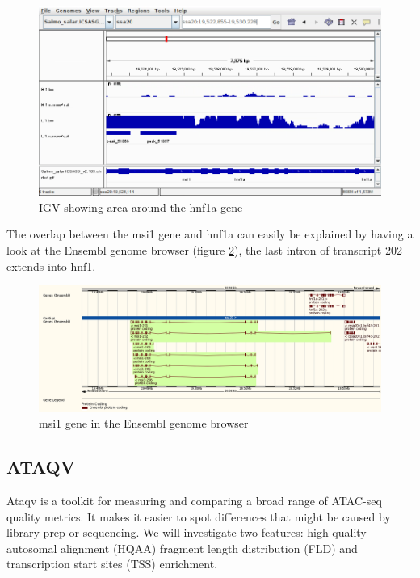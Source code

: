 \documentclass[12pt]{article}
\begin{document}
			\begin{figure}[H]
				\includegraphics[width=\textwidth]{hnf1a.png}
				\caption{IGV showing area around the hnf1a gene}
				\label{fig:hnf1a}		
			\end{figure}
			
			The overlap between the msi1 gene and hnf1a can easily be explained by having a look at the Ensembl genome browser (figure \ref{fig:msi1}), the last intron of transcript 202 extends into hnf1.
			
			\begin{figure}[H]
				\includegraphics[width=\textwidth]{Atlantic_salmon_msi1.png}
				\caption{msi1 gene in the Ensembl genome browser}
				\label{fig:msi1}
			\end{figure}
		
		\subsection{ATAQV}
			Ataqv is a toolkit for measuring and comparing a broad range of ATAC-seq quality metrics. 
			It makes it easier to spot differences that might be caused by library prep or sequencing. 
			We will investigate two features: high quality autosomal alignment (HQAA) fragment length distribution (FLD) and  transcription start sites (TSS) enrichment.
		
\end{document}
